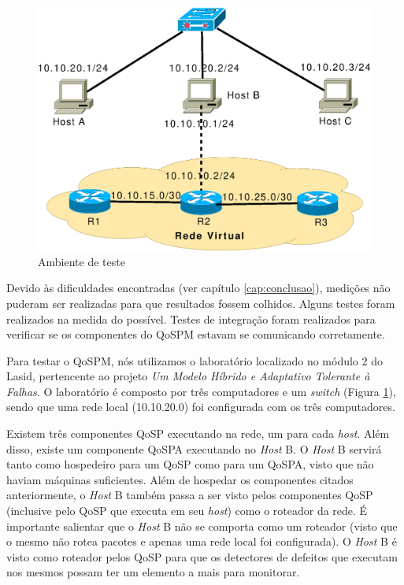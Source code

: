 \begin{figure}
\centering
\includegraphics[scale=0.7]{ambiente_teste}
\caption{Ambiente de teste}
\label{fig:ambiente_teste}
\end{figure}

	Devido às dificuldades encontradas (ver capítulo \ref{cap:conclusao}), medições não puderam ser realizadas para que resultados fossem colhidos. Alguns testes foram realizados na medida do possível. Testes de integração foram realizados para verificar se os componentes do QoSPM estavam se comunicando corretamente.
	
	Para testar o QoSPM, nós utilizamos o laboratório localizado no módulo 2 do Lasid, pertencente ao projeto \textit{Um Modelo Híbrido e Adaptativo Tolerante à Falhas}. O laboratório é composto por três computadores e um \textit{switch} (Figura \ref{fig:ambiente_teste}), sendo que uma rede local (10.10.20.0) foi configurada com os três computadores.
	
	Existem três componentes QoSP executando na rede, um para cada \textit{host}. Além disso, existe um componente QoSPA executando no \textit{Host} B. O \textit{Host} B servirá tanto como hospedeiro para um QoSP como para um QoSPA, visto que não haviam máquinas suficientes. Além de hospedar os componentes citados anteriormente, o \textit{Host} B também passa a ser visto pelos componentes QoSP (inclusive pelo QoSP que executa em seu \textit{host}) como o roteador da rede. É importante salientar que o \textit{Host} B não se comporta como um roteador (visto que o mesmo não rotea pacotes e apenas uma rede local foi configurada). O \textit{Host} B é visto como roteador pelos QoSP para que os detectores de defeitos que executam nos mesmos possam ter um elemento a mais para monitorar.
	
